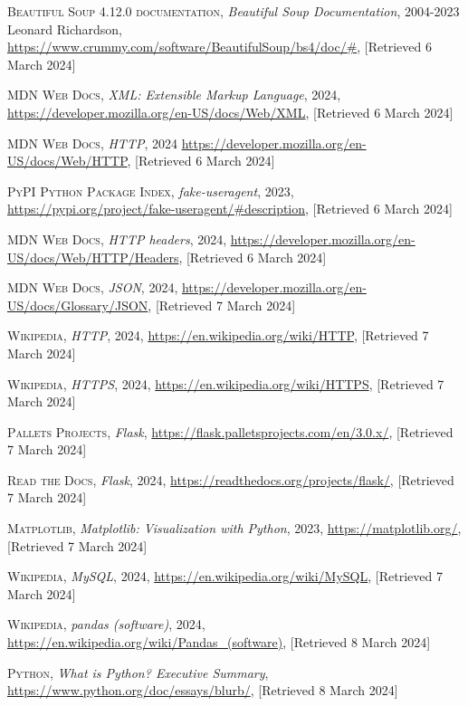 \documentclass{thesis-ekf}
\theoremstyle{definition}
\theoremstyle{remark}
\begin{document}
\begin{thebibliography}{2}
\textsc{Beautiful Soup 4.12.0 documentation}, 
\emph{Beautiful Soup Documentation}, 2004-2023 Leonard Richardson,
\url{https://www.crummy.com/software/BeautifulSoup/bs4/doc/#}, [Retrieved 6 March 2024]

\textsc{MDN Web Docs}, 
\emph{XML: Extensible Markup Language}, 2024,
\url{https://developer.mozilla.org/en-US/docs/Web/XML}, [Retrieved 6 March 2024]

\textsc{MDN Web Docs}, 
\emph{HTTP}, 2024
\url{https://developer.mozilla.org/en-US/docs/Web/HTTP}, [Retrieved 6 March 2024]

\textsc{PyPI Python Package Index},
\emph{fake-useragent}, 2023,
\url{https://pypi.org/project/fake-useragent/#description}, [Retrieved 6 March 2024]

\textsc{MDN Web Docs}, 
\emph{HTTP headers}, 2024,
\url{https://developer.mozilla.org/en-US/docs/Web/HTTP/Headers}, [Retrieved 6 March 2024]

\textsc{MDN Web Docs},
\emph{JSON}, 2024,
\url{https://developer.mozilla.org/en-US/docs/Glossary/JSON}, [Retrieved 7 March 2024]

\textsc{Wikipedia},
\emph{HTTP}, 2024,
\url{https://en.wikipedia.org/wiki/HTTP}, [Retrieved 7 March 2024]

\textsc{Wikipedia},
\emph{HTTPS}, 2024,
\url{https://en.wikipedia.org/wiki/HTTPS}, [Retrieved 7 March 2024]

\textsc{Pallets Projects},
\emph{Flask}, 
\url{https://flask.palletsprojects.com/en/3.0.x/}, [Retrieved 7 March 2024]

\textsc{Read the Docs},
\emph{Flask}, 2024,
\url{https://readthedocs.org/projects/flask/}, [Retrieved 7 March 2024]

\textsc{Matplotlib}, 
\emph{Matplotlib: Visualization with Python}, 2023,
\url{https://matplotlib.org/}, [Retrieved 7 March 2024]

\textsc{Wikipedia},
\emph{MySQL}, 2024,
\url{https://en.wikipedia.org/wiki/MySQL}, [Retrieved 7 March 2024]

\textsc{Wikipedia},
\emph{pandas (software)}, 2024,
\url{https://en.wikipedia.org/wiki/Pandas_(software)}, [Retrieved 8 March 2024]

\textsc{Python},
\emph{What is Python? Executive Summary},
\url{https://www.python.org/doc/essays/blurb/}, [Retrieved 8 March 2024]


\end{thebibliography}
\end{document}
